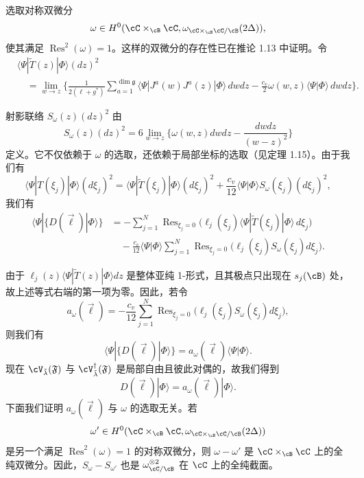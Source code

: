 

选取对称双微分
\[
 \omega\in H^0(\cC\times_\cB\cC,\omega_{\cC\times_\cB\cC/\cB}(2\Delta)),
\]
使其满足 $\operatorname{Res}^2(\omega)=1$。这样的双微分的存在性已在推论 1.13 中证明。令
\begin{align}
 &\langle\Psi|\tilde T(z)|\Phi\rangle(dz)^2 \nonumber\\
 &\quad=\lim_{w\to z}\Big\{\frac{1}{2(\ell+g^*)}
   \sum_{a=1}^{\dim\mathfrak g}\langle\Psi|J^a(w)J^a(z)|\Phi\rangle\,dwdz
   -\frac{c_v}{2}\omega(w,z)\langle\Psi|\Phi\rangle\,dwdz\Big\}. \tag{5.2}
\end{align}

射影联络 $S_\omega(z)(dz)^2$ 由
\[
 S_\omega(z)(dz)^2=6\lim_{w\to z}\Big\{\omega(w,z)dwdz-\frac{dwdz}{(w-z)^2}\Big\}
\]
定义。它不仅依赖于 $\omega$ 的选取，还依赖于局部坐标的选取（见定理 1.15）。由于我们有
\[
 \langle\Psi|T(\xi_j)|\Phi\rangle(d\xi_j)^2
 =\langle\Psi|\tilde T(\xi_j)|\Phi\rangle(d\xi_j)^2
 +\frac{c_v}{12}\langle\Psi|\Phi\rangle S_\omega(\xi_j)(d\xi_j)^2,
\]
我们有
\begin{align}
 \langle\Psi|\{D(\vec\ell)|\Phi\rangle\}
 &=-\sum_{j=1}^{N}\operatorname{Res}_{\xi_j=0}
   \big(\ell_j(\xi_j)\langle\Psi|\tilde T(\xi_j)|\Phi\rangle\,d\xi_j\big)
   \nonumber\\
 &\quad-\frac{c_v}{12}\langle\Psi|\Phi\rangle
   \sum_{j=1}^{N}\operatorname{Res}_{\xi_j=0}
   \big(\ell_j(\xi_j)S_\omega(\xi_j)d\xi_j\big). \tag{5.3}
\end{align}

由于 $\ell_j(z)\langle\Psi|\tilde T(z)|\Phi\rangle dz$ 是整体亚纯 1-形式，且其极点只出现在 $s_j(\cB)$ 处，故上述等式右端的第一项为零。因此，若令
\begin{equation}
 a_\omega(\vec\ell)=-\frac{c_v}{12}\sum_{j=1}^{N}\operatorname{Res}_{\xi_j=0}
 \big(\ell_j(\xi_j)S_\omega(\xi_j)d\xi_j\big), \tag{5.4}
\end{equation}
则我们有
\[
 \langle\Psi|\{D(\vec\ell)|\Phi\rangle\}=a_\omega(\vec\ell)\langle\Psi|\Phi\rangle.
\]
现在 $\cV_{\tilde\lambda}(\mathfrak F)$ 与 $\cV^\dagger_{\tilde\lambda}(\mathfrak F)$ 是局部自由且彼此对偶的，故我们得到
\[
 D(\vec\ell)|\Phi\rangle=a_\omega(\vec\ell)|\Phi\rangle.
\]
下面我们证明 $a_\omega(\vec\ell)$ 与 $\omega$ 的选取无关。若
\[
 \omega'\in H^0(\cC\times_\cB\cC,\omega_{\cC\times_\cB\cC/\cB}(2\Delta))
\]
是另一个满足 $\operatorname{Res}^2(\omega)=1$ 的对称双微分，则 $\omega-\omega'$ 是 $\cC\times_\cB\cC$ 上的全纯双微分。因此，$S_\omega-S_{\omega'}$ 也是 $\omega_{\cC/\cB}^{\otimes2}$ 在 $\cC$ 上的全纯截面。

